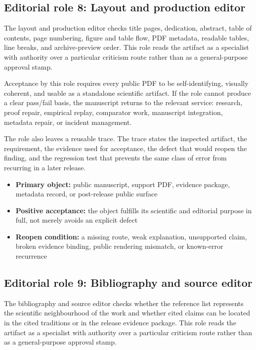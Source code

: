 \subsection{Editorial role 8: Layout and production editor}

The layout and production editor checks title pages, dedication, abstract, table of contents, page numbering, figure and table flow, PDF metadata, readable tables, line breaks, and archive-preview order. This role reads the artifact as a specialist with authority over a particular criticism route rather than as a general-purpose approval stamp.


Acceptance by this role requires every public PDF to be self-identifying, visually coherent, and usable as a standalone scientific artifact. If the role cannot produce a clear pass/fail basis, the manuscript returns to the relevant service: research, proof repair, empirical replay, comparator work, manuscript integration, metadata repair, or incident management.


The role also leaves a reusable trace. The trace states the inspected artifact, the requirement, the evidence used for acceptance, the defect that would reopen the finding, and the regression test that prevents the same class of error from recurring in a later release.


\begin{itemize}[leftmargin=1.8em]

\item \textbf{Primary object:} public manuscript, support PDF, evidence package, metadata record, or post-release public surface

\item \textbf{Positive acceptance:} the object fulfills its scientific and editorial purpose in full, not merely avoids an explicit defect

\item \textbf{Reopen condition:} a missing route, weak explanation, unsupported claim, broken evidence binding, public rendering mismatch, or known-error recurrence

\end{itemize}

\subsection{Editorial role 9: Bibliography and source editor}

The bibliography and source editor checks whether the reference list represents the scientific neighbourhood of the work and whether cited claims can be located in the cited traditions or in the release evidence package. This role reads the artifact as a specialist with authority over a particular criticism route rather than as a general-purpose approval stamp.


